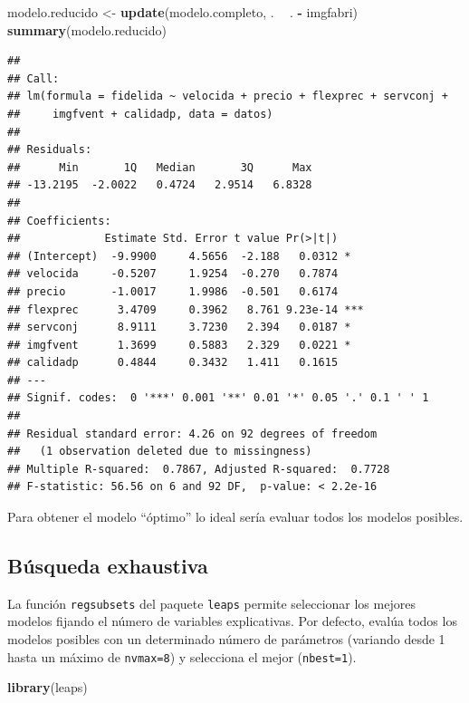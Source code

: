 \documentclass[]{book}
\newenvironment{Shaded}{\begin{snugshade}}{\end{snugshade}}
\newcommand{\KeywordTok}[1]{\textcolor[rgb]{0.13,0.29,0.53}{\textbf{#1}}}
\newcommand{\StringTok}[1]{\textcolor[rgb]{0.31,0.60,0.02}{#1}}
\newcommand{\OperatorTok}[1]{\textcolor[rgb]{0.81,0.36,0.00}{\textbf{#1}}}
\newcommand{\NormalTok}[1]{#1}
\begin{document}
\begin{Shaded}
\begin{Highlighting}[]
\NormalTok{modelo.reducido <-}\StringTok{ }\KeywordTok{update}\NormalTok{(modelo.completo, . }\OperatorTok{~}\StringTok{ }\NormalTok{. }\OperatorTok{-}\StringTok{ }\NormalTok{imgfabri)}
\KeywordTok{summary}\NormalTok{(modelo.reducido)}
\end{Highlighting}
\end{Shaded}

\begin{verbatim}
## 
## Call:
## lm(formula = fidelida ~ velocida + precio + flexprec + servconj + 
##     imgfvent + calidadp, data = datos)
## 
## Residuals:
##      Min       1Q   Median       3Q      Max 
## -13.2195  -2.0022   0.4724   2.9514   6.8328 
## 
## Coefficients:
##             Estimate Std. Error t value Pr(>|t|)    
## (Intercept)  -9.9900     4.5656  -2.188   0.0312 *  
## velocida     -0.5207     1.9254  -0.270   0.7874    
## precio       -1.0017     1.9986  -0.501   0.6174    
## flexprec      3.4709     0.3962   8.761 9.23e-14 ***
## servconj      8.9111     3.7230   2.394   0.0187 *  
## imgfvent      1.3699     0.5883   2.329   0.0221 *  
## calidadp      0.4844     0.3432   1.411   0.1615    
## ---
## Signif. codes:  0 '***' 0.001 '**' 0.01 '*' 0.05 '.' 0.1 ' ' 1
## 
## Residual standard error: 4.26 on 92 degrees of freedom
##   (1 observation deleted due to missingness)
## Multiple R-squared:  0.7867, Adjusted R-squared:  0.7728 
## F-statistic: 56.56 on 6 and 92 DF,  p-value: < 2.2e-16
\end{verbatim}

Para obtener el modelo ``óptimo'' lo ideal sería evaluar todos los
modelos posibles.

\subsection{Búsqueda exhaustiva}\label{busqueda-exhaustiva}

La función \texttt{regsubsets} del paquete \texttt{leaps} permite
seleccionar los mejores modelos fijando el número de variables
explicativas. Por defecto, evalúa todos los modelos posibles con un
determinado número de parámetros (variando desde 1 hasta un máximo de
\texttt{nvmax=8}) y selecciona el mejor (\texttt{nbest=1}).

\begin{Shaded}
\begin{Highlighting}[]
\KeywordTok{library}\NormalTok{(leaps)}
\end{Highlighting}
\end{Shaded}
\end{document}
